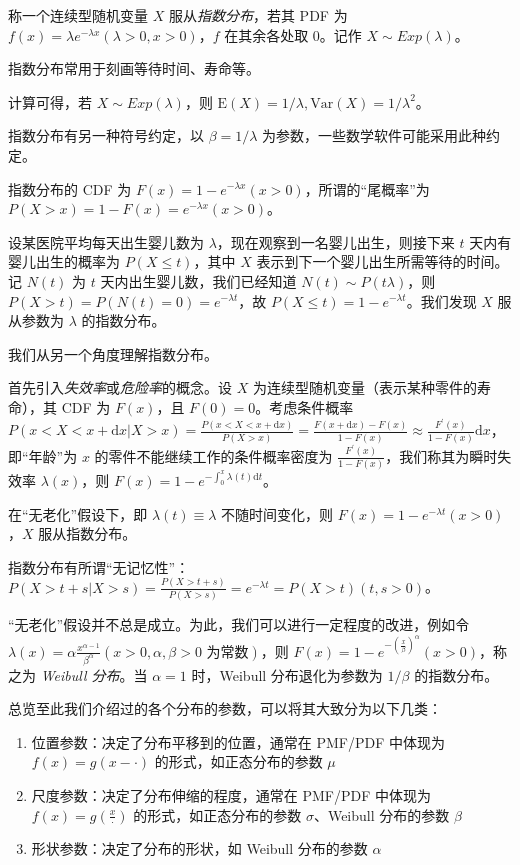 \documentclass[../main.tex]{subfiles}
\begin{document}
\begin{definition}\label{def:2.5.3}
称一个连续型随机变量 $X$ 服从\emph{指数分布}，若其 PDF 为 $f(x)=\lambda e^{-\lambda x}(\lambda>0,x>0)$，$f$ 在其余各处取 $0$。记作 $X\sim Exp(\lambda)$。
\end{definition}

指数分布常用于刻画等待时间、寿命等。

计算可得，若 $X\sim Exp(\lambda)$，则 $\mathrm{E}(X)=1/\lambda,\mathrm{Var}(X)=1/\lambda^2$。

指数分布有另一种符号约定，以 $\beta=1/\lambda$ 为参数，一些数学软件可能采用此种约定。

指数分布的 CDF 为 $F(x)=1-e^{-\lambda x}(x>0)$，所谓的“尾概率”为 $P(X>x)=1-F(x)=e^{-\lambda x}(x>0)$。

\begin{example}
设某医院平均每天出生婴儿数为 $\lambda$，现在观察到一名婴儿出生，则接下来 $t$ 天内有婴儿出生的概率为 $P(X\leq t)$，其中 $X$ 表示到下一个婴儿出生所需等待的时间。\\
记 $N(t)$ 为 $t$ 天内出生婴儿数，我们已经知道 $N(t)\sim P(t\lambda)$，则 $P(X>t)=P(N(t)=0)=e^{-\lambda t}$，故 $P(X\leq t)=1-e^{-\lambda t}$。我们发现 $X$ 服从参数为 $\lambda$ 的指数分布。
\end{example}

我们从另一个角度理解指数分布。

首先引入\emph{失效率}或\emph{危险率}的概念。设 $X$ 为连续型随机变量（表示某种零件的寿命），其 CDF 为 $F(x)$，且 $F(0)=0$。考虑条件概率 $P(x<X<x+\mathrm{d}x|X>x)=\frac{P(x<X<x+\mathrm{d}x)}{P(X>x)}=\frac{F(x+\mathrm{d}x)-F(x)}{1-F(x)}\approx\frac{F^\prime(x)}{1-F(x)}\mathrm{d}x$，即“年龄”为 $x$ 的零件不能继续工作的条件概率密度为 $\frac{F^\prime(x)}{1-F(x)}$，我们称其为瞬时失效率 $\lambda(x)$，则 $F(x)=1-e^{-\int_0^x\lambda(t)\mathrm{d}t}$。

在“无老化”假设下，即 $\lambda(t)\equiv \lambda$ 不随时间变化，则 $F(x)=1-e^{-\lambda t}(x>0)$，$X$ 服从指数分布。

指数分布有所谓“无记忆性”：$P(X>t+s|X>s)=\frac{P(X>t+s)}{P(X>s)}=e^{-\lambda t}=P(X>t)(t,s>0)$。

“无老化”假设并不总是成立。为此，我们可以进行一定程度的改进，例如令 $\lambda(x)=\alpha\frac{x^{\alpha-1}}{\beta^\alpha}(x>0,\alpha,\beta>0\text{ 为常数})$，则 $F(x)=1-e^{-(\frac{x}{\beta})^\alpha}(x>0)$，称之为 \emph{Weibull 分布}。当 $\alpha=1$ 时，Weibull 分布退化为参数为 $1/\beta$ 的指数分布。

总览至此我们介绍过的各个分布的参数，可以将其大致分为以下几类：
\begin{enumerate}
    \item 位置参数：决定了分布平移到的位置，通常在 PMF/PDF 中体现为 $f(x)=g(x-\cdot)$ 的形式，如正态分布的参数 $\mu$
    \item 尺度参数：决定了分布伸缩的程度，通常在 PMF/PDF 中体现为 $f(x)=g(\frac x\cdot)$ 的形式，如正态分布的参数 $\sigma$、Weibull 分布的参数 $\beta$
    \item 形状参数：决定了分布的形状，如 Weibull 分布的参数 $\alpha$
\end{enumerate}
\end{document}
